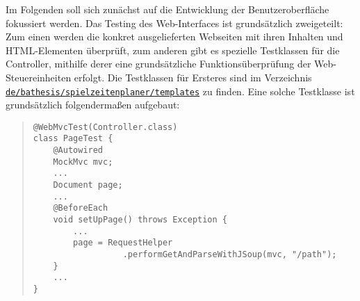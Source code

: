 
Im Folgenden soll sich zunächst auf die Entwicklung der Benutzeroberfläche fokussiert 
werden. Das Testing des Web-Interfaces ist grundsätzlich zweigeteilt: 
Zum einen werden die konkret ausgelieferten Webseiten mit ihren Inhalten und 
HTML-Elementen überprüft, zum anderen gibt es spezielle Testklassen für die Controller, 
mithilfe derer eine grundsätzliche Funktionsüberprüfung der Web-Steuereinheiten erfolgt. 
Die Testklassen für Ersteres sind im Verzeichnis 
\href{https://github.com/FlorianOhmes/bat_spielzeitenplaner/tree/main/spielzeitenplaner/src/test/java/de/bathesis/spielzeitenplaner/templates}{\texttt{de/bathesis/spielzeitenplaner/templates}} 
zu finden. Eine solche Testklasse ist grundsätzlich folgendermaßen aufgebaut: 

\begin{quote}
\begin{verbatim}
@WebMvcTest(Controller.class)
class PageTest {
    @Autowired
    MockMvc mvc;
    ...
    Document page;
    ...
    @BeforeEach
    void setUpPage() throws Exception {
        ...
        page = RequestHelper
                  .performGetAndParseWithJSoup(mvc, "/path");
    }
    ...
}
\end{verbatim}
\end{quote}

